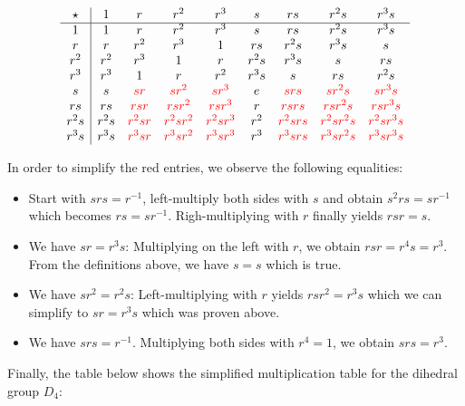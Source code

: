 \[
\begin{array}{c|cccccccc}
\star   & 1    & r & r^2  & r^3 & s & rs & r^2s & r^3s \\
\hline
1 & 1 & r & r^2 & r^3 & s & rs & r^2s & r^3s \\
r & r & r^2 & r^3 & 1 & rs & r^2s & r^3s  & s \\
r^2 & r^2 & r^3 & 1 & r & r^2 s & r^3s & s & rs \\
r^3 & r^3 & 1 & r & r^2 & r^3s & s & rs & r^2s \\
s  &  s & \color{red}{sr} & \color{red}{sr^2} & \color{red}{sr^3} & e & \color{red}{srs}  & \color{red}{sr^2s} & \color{red}{sr^3s} \\
rs & rs & \color{red}{rsr} & \color{red}{rsr^2} & \color{red}{rsr^3} & r & \color{red}{rsrs}  & \color{red}{rsr^2s} & \color{red}{rsr^3s} \\
r^2s & r^2s & \color{red}{r^2sr} & \color{red}{r^2sr^2} & \color{red}{r^2sr^3} & r^2 & \color{red}{r^2srs}  & \color{red}{r^2sr^2s} & \color{red}{r^2sr^3s} \\
r^3s & r^3s & \color{red}{r^3sr} & \color{red}{r^3sr^2} & \color{red}{r^3sr^3} & r^3 & \color{red}{r^3srs} & \color{red}{r^3sr^2s} & \color{red}{r^3sr^3s}
\end{array}
\]

In order to simplify the red entries, we observe the following equalities:

\begin{itemize}
\item
  Start with $srs = r^{-1}$, left-multiply both sides with $s$ and obtain $s^2rs = s r^{-1}$ which becomes $rs = s r^{-1}$.   Righ-multiplying with $r$ finally yields $rsr = s$.
\item
  We have $sr = r^3 s$: Multiplying on the left with $r$, we obtain $rsr = r^4 s = r^3$. From the definitions above, we have $s = s$ which is true.
\item
  We have $sr^2 = r^2s$: Left-multiplying with $r$ yields $rsr^2 = r^3s$ which we can simplify to $sr = r^3s$ which was proven above.
\item
  We have $srs = r^{-1}$. Multiplying both sides with $r^4 = 1$, we obtain $srs = r^3$.
\end{itemize}

Finally, the table below shows the simplified multiplication table for the dihedral group $D_4$:

